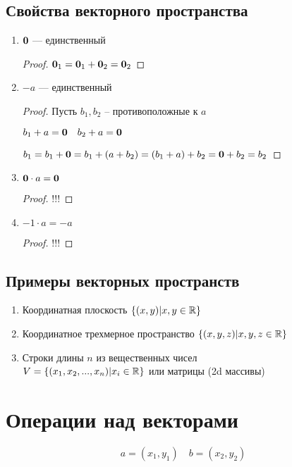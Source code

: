 \documentclass[main]{subfiles}
\begin{document}
\subsection{Свойства векторного пространства}

\begin{enumerate}
    \item $\mathbf{0}$ --- единственный \begin{proof}
              $\mathbf{0}_1 = \mathbf{0}_1 + \mathbf{0}_2 = \mathbf{0}_2$
          \end{proof}
    \item $-a$ --- единственный \begin{proof}
              Пусть $b_1, b_2$ -- противоположные к $a$

              $b_1 + a = \mathbf{0} \quad b_2 + a = \mathbf{0}$

              $b_1 = b_1 + \mathbf{0} = b_1 + (a + b_2) = (b_1+a)+b_2 = \mathbf{0} +b_2 = b_2$
          \end{proof}
    \item $\mathbf{0}\cdot a = \mathbf{0}$ \begin{proof}
              !!!
          \end{proof}
    \item $-1\cdot a = -a$ \begin{proof}
              !!!
          \end{proof}
\end{enumerate}

\subsection{Примеры векторных пространств}
\begin{enumerate}
    \item Координатная плоскость $\{(x,y)|x,y\in \mathbb{R}\}$
    \item Координатное трехмерное пространство $\{(x,y,z)|x,y,z\in \mathbb{R}\}$
    \item Строки длины $n$ из вещественных чисел \\
          $V = \{(x_1, x_2, ..., x_n)|x_i \in \mathbb{R}\}$ или матрицы (2d массивы)
\end{enumerate}

\section{Операции над векторами}
\begin{equation*}
    a = (x_1, y_1) \quad b = (x_2, y_2)
\end{equation*}
\end{document}
